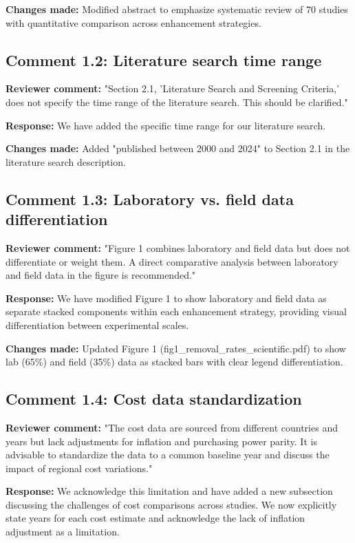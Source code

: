 \documentclass[12pt,a4paper]{article}
\begin{document}
\textbf{Changes made:} Modified abstract to emphasize systematic review of 70 studies with quantitative comparison across enhancement strategies.

\subsection{Comment 1.2: Literature search time range}
\textbf{Reviewer comment:} "Section 2.1, 'Literature Search and Screening Criteria,' does not specify the time range of the literature search. This should be clarified."

\textbf{Response:} We have added the specific time range for our literature search.

\textbf{Changes made:} Added "published between 2000 and 2024" to Section 2.1 in the literature search description.

\subsection{Comment 1.3: Laboratory vs. field data differentiation}
\textbf{Reviewer comment:} "Figure 1 combines laboratory and field data but does not differentiate or weight them. A direct comparative analysis between laboratory and field data in the figure is recommended."

\textbf{Response:} We have modified Figure 1 to show laboratory and field data as separate stacked components within each enhancement strategy, providing visual differentiation between experimental scales.

\textbf{Changes made:} Updated Figure 1 (fig1\_removal\_rates\_scientific.pdf) to show lab (65\%) and field (35\%) data as stacked bars with clear legend differentiation.

\subsection{Comment 1.4: Cost data standardization}
\textbf{Reviewer comment:} "The cost data are sourced from different countries and years but lack adjustments for inflation and purchasing power parity. It is advisable to standardize the data to a common baseline year and discuss the impact of regional cost variations."

\textbf{Response:} We acknowledge this limitation and have added a new subsection discussing the challenges of cost comparisons across studies. We now explicitly state years for each cost estimate and acknowledge the lack of inflation adjustment as a limitation.
\end{document}
